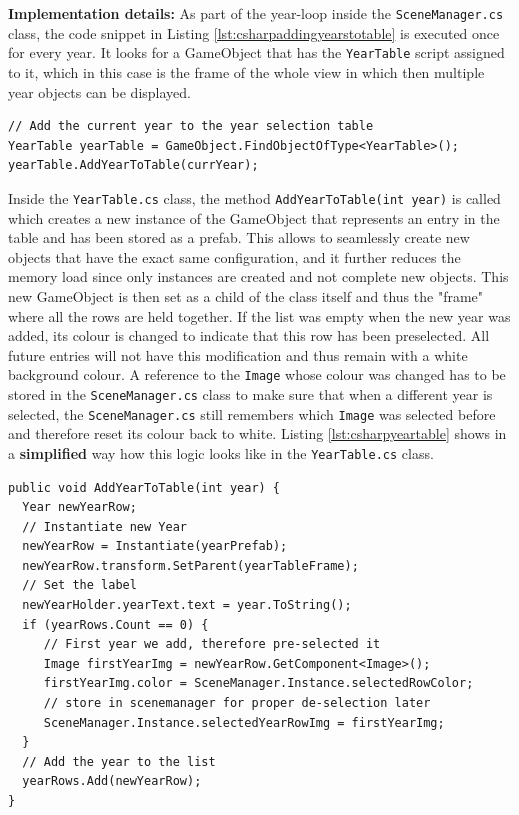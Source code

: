 \textbf{Implementation details:} As part of the year-loop inside the \texttt{SceneManager.cs} class, the code snippet in Listing \ref{lst:csharpaddingyearstotable} is executed once for every year. It looks for a GameObject that has the \texttt{YearTable} script assigned to it, which in this case is the frame of the whole view in which then multiple year objects can be displayed.
\begin{lstlisting}[caption={SceneManager.cs : Adding years to the YearTable}, label={lst:csharpaddingyearstotable}]
// Add the current year to the year selection table
YearTable yearTable = GameObject.FindObjectOfType<YearTable>();
yearTable.AddYearToTable(currYear);
\end{lstlisting}
Inside the \texttt{YearTable.cs} class, the method \texttt{AddYearToTable(int year)} is called which creates a new instance of the GameObject that represents an entry in the table and has been stored as a prefab. This allows to seamlessly create new objects that have the exact same configuration, and it further reduces the memory load since only instances are created and not complete new objects. This new GameObject is then set as a child of the class itself and thus the "frame" where all the rows are held together. If the list was empty when the new year was added, its colour is changed to indicate that this row has been preselected. All future entries will not have this modification and thus remain with a white background colour. A reference to the \texttt{Image} whose colour was changed has to be stored in the \texttt{SceneManager.cs} class to make sure that when a different year is selected, the \texttt{SceneManager.cs} still remembers which \texttt{Image} was selected before and therefore reset its colour back to white. Listing \ref{lst:csharpyeartable} shows in a \textbf{simplified} way how this logic looks like in the \texttt{YearTable.cs} class.
\begin{lstlisting}[caption={YearTable.cs : Simplification of adding a new year to the table}, label={lst:csharpyeartable}]
public void AddYearToTable(int year) {
  Year newYearRow;
  // Instantiate new Year
  newYearRow = Instantiate(yearPrefab);
  newYearRow.transform.SetParent(yearTableFrame);
  // Set the label
  newYearHolder.yearText.text = year.ToString();
  if (yearRows.Count == 0) {
     // First year we add, therefore pre-selected it
     Image firstYearImg = newYearRow.GetComponent<Image>();
     firstYearImg.color = SceneManager.Instance.selectedRowColor;
     // store in scenemanager for proper de-selection later
     SceneManager.Instance.selectedYearRowImg = firstYearImg;
  }
  // Add the year to the list
  yearRows.Add(newYearRow);
}
\end{lstlisting}


